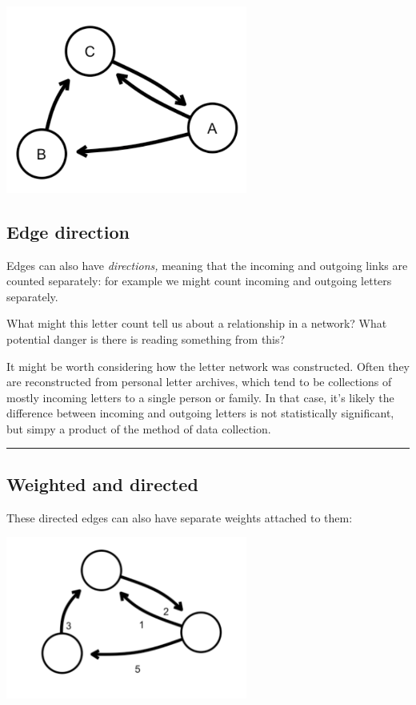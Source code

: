 \documentclass[
]{book}
\begin{document}
\includegraphics[width=3.125in,height=\textheight]{images/Screenshot 2022-09-26 at 11.42.58.png}

\hypertarget{edge-direction}{%
\subsection{Edge direction}\label{edge-direction}}

Edges can also have \emph{directions,} meaning that the incoming and outgoing links are counted separately: for example we might count incoming and outgoing letters separately.

What might this letter count tell us about a relationship in a network? What potential danger is there is reading something from this?

It might be worth considering how the letter network was constructed. Often they are reconstructed from personal letter archives, which tend to be collections of mostly incoming letters to a single person or family. In that case, it's likely the difference between incoming and outgoing letters is not statistically significant, but simpy a product of the method of data collection.

\begin{center}\rule{0.5\linewidth}{0.5pt}\end{center}

\hypertarget{weighted-and-directed}{%
\subsection{Weighted and directed}\label{weighted-and-directed}}

These directed edges can also have separate weights attached to them:

\includegraphics[width=3.125in,height=\textheight]{images/Screenshot 2022-09-26 at 11.31.15.png}
\end{document}
